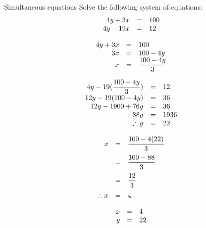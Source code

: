 \begin{wex}
{Simultaneous equations}
{
Solve the following system of equations:
\begin{equation*}
\begin{array}{ccc}\hfill 4y+3x& =& 100\hfill \\ 
\hfill 4y - 19x& =& 12\hfill 
\end{array}
\end{equation*}
}
{
\begin{equation*}
    \begin{array}{ccl}\hfill 4y+3x & =& 100\hfill \\
\hfill 3x &=& 100 - 4y \hfill \\
\hfill x& =& \dfrac{100 - 4y}{3} \hfill
    \end{array}
\end{equation*}


\begin{equation*}
    \begin{array}{ccl}\hfill 4y - 19(\dfrac{100 - 4y}{3})& =& 12\hfill \\
	\hfill 12y - 19(100 - 4y)  & =& 36\hfill \\
	\hfill 12y - 1900 + 76y & =& 36 \hfill \\
\hfill  88y& =& 1936 \hfill \\
\hfill \therefore y& =& 22 \hfill
    \end{array}
\end{equation*}

\begin{equation*}
    \begin{array}{ccl}\hfill x &=& \dfrac{100 - 4(22)}{3}\hfill \vspace{6pt}\\
	\hfill & =& \dfrac{100-88}{3}\hfill \vspace{6pt}\\
	\hfill & =& \dfrac{12}{3}\hfill\vspace{6pt} \\
	\hfill \therefore x&=& 4 \hfill 
    \end{array}
\end{equation*}


\begin{equation*}
\begin{array}{ccc}
 \hfill x& =& 4\hfill \\
\hfill y& =& 22\hfill 
\end{array}
\end{equation*}
}
\end{wex}

